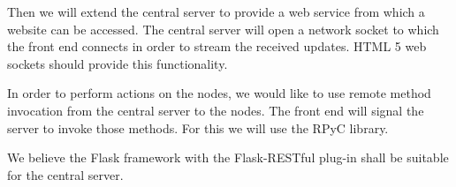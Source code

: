 \documentclass{article}
\begin{document}
	Then we will extend the central server to provide a web service from which a website can be accessed. The central server will open a network socket to which the front end connects in order to stream the received updates. HTML 5 web sockets should provide this functionality.

	In order to perform actions on the nodes, we would like to use remote method invocation from the central server to the nodes. The front end will signal the server to invoke those methods. For this we will use the RPyC library.

	We believe the Flask framework with the Flask-RESTful plug-in shall be suitable for the central server.
\end{document}
